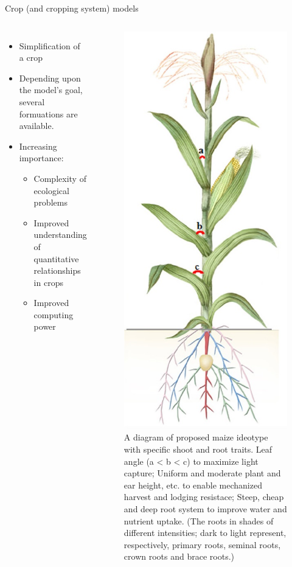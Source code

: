 \documentclass[11pt,dvipsnames,ignorenonframetext,aspectratio=169]{beamer}
\providecommand{\tightlist}{%
  \setlength{\itemsep}{0pt}\setlength{\parskip}{0pt}}
\newcommand{\bcolumns}{\begin{columns}[T, onlytextwidth]}
\newcommand{\ecolumns}{\end{columns}}
\begin{document}
\begin{frame}{Crop (and cropping system) models}
\protect\hypertarget{crop-and-cropping-system-models}{}
\bcolumns
{}

\begin{itemize}
\tightlist
\item
  Simplification of a crop
\item
  Depending upon the model's goal, several formuations are available.
\item
  Increasing importance:

  \begin{itemize}
  \tightlist
  \item
    Complexity of ecological problems
  \item
    Improved understanding of quantitative relationships in crops
  \item
    Improved computing power
  \end{itemize}
\end{itemize}


\begin{figure}
\includegraphics[width=0.36\linewidth]{../images/maize-ideotype} \caption{A diagram of proposed maize ideotype with specific shoot and root traits. Leaf angle (a < b < c) to maximize light capture; Uniform and moderate plant and ear height, etc. to enable mechanized harvest and lodging resistace; Steep, cheap and deep root system to improve water and nutrient uptake. (The roots in shades of different intensities; dark to light represent, respectively, primary roots, seminal roots, crown roots and brace roots.)}\label{fig:crop-model-ideotype}
\end{figure}

\ecolumns
\end{frame}
\end{document}
